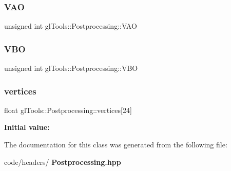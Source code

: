 \subsubsection{VAO}
{\footnotesize\ttfamily unsigned int gl\+Tools\+::\+Postprocessing\+::\+V\+AO}

\mbox{\label{classgl_tools_1_1_postprocessing_a1503e80fb9c465f0d06fe635a334630b}} 
\subsubsection{VBO}
{\footnotesize\ttfamily unsigned int gl\+Tools\+::\+Postprocessing\+::\+V\+BO}

\mbox{\label{classgl_tools_1_1_postprocessing_a100bcb9abc7c434d8bcf9243e9e990e5}} 
\subsubsection{vertices}
{\footnotesize\ttfamily float gl\+Tools\+::\+Postprocessing\+::vertices[24]}

{\bfseries Initial value\+:}
\begin{DoxyCode}{0}
\DoxyCodeLine{= \{ }
\DoxyCodeLine{}
\DoxyCodeLine{}
\DoxyCodeLine{        \}}

\end{DoxyCode}


The documentation for this class was generated from the following file\+:\begin{DoxyCompactItemize}
\item 
code/headers/\textbf{ Postprocessing.\+hpp}\end{DoxyCompactItemize}
